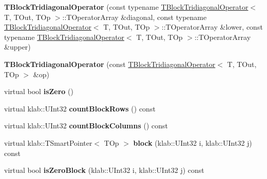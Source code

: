 \begin{DoxyCompactItemize}
\item 
{\bfseries T\+Block\+Tridiagonal\+Operator} (const typename \hyperlink{classkl1p_1_1TBlockTridiagonalOperator}{T\+Block\+Tridiagonal\+Operator}$<$ T, T\+Out, T\+Op $>$\+::T\+Operator\+Array \&diagonal, const typename \hyperlink{classkl1p_1_1TBlockTridiagonalOperator}{T\+Block\+Tridiagonal\+Operator}$<$ T, T\+Out, T\+Op $>$\+::T\+Operator\+Array \&lower, const typename \hyperlink{classkl1p_1_1TBlockTridiagonalOperator}{T\+Block\+Tridiagonal\+Operator}$<$ T, T\+Out, T\+Op $>$\+::T\+Operator\+Array \&upper)\hypertarget{classkl1p_1_1TBlockTridiagonalOperator_a87a7873f0782fb05915f809fc36319da}{}\label{classkl1p_1_1TBlockTridiagonalOperator_a87a7873f0782fb05915f809fc36319da}

\item 
{\bfseries T\+Block\+Tridiagonal\+Operator} (const \hyperlink{classkl1p_1_1TBlockTridiagonalOperator}{T\+Block\+Tridiagonal\+Operator}$<$ T, T\+Out, T\+Op $>$ \&op)\hypertarget{classkl1p_1_1TBlockTridiagonalOperator_aa0adc9ee189b2a204de3c17342b46729}{}\label{classkl1p_1_1TBlockTridiagonalOperator_aa0adc9ee189b2a204de3c17342b46729}

\item 
virtual bool {\bfseries is\+Zero} ()\hypertarget{classkl1p_1_1TBlockTridiagonalOperator_a6a373ba3575c7881967d7073001d810b}{}\label{classkl1p_1_1TBlockTridiagonalOperator_a6a373ba3575c7881967d7073001d810b}

\item 
virtual klab\+::\+U\+Int32 {\bfseries count\+Block\+Rows} () const \hypertarget{classkl1p_1_1TBlockTridiagonalOperator_aac39849319dece38b0634cab0ce861e0}{}\label{classkl1p_1_1TBlockTridiagonalOperator_aac39849319dece38b0634cab0ce861e0}

\item 
virtual klab\+::\+U\+Int32 {\bfseries count\+Block\+Columns} () const \hypertarget{classkl1p_1_1TBlockTridiagonalOperator_aceac6d7a78d22b49164806d78bee6f9f}{}\label{classkl1p_1_1TBlockTridiagonalOperator_aceac6d7a78d22b49164806d78bee6f9f}

\item 
virtual klab\+::\+T\+Smart\+Pointer$<$ T\+Op $>$ {\bfseries block} (klab\+::\+U\+Int32 i, klab\+::\+U\+Int32 j) const \hypertarget{classkl1p_1_1TBlockTridiagonalOperator_a0bc4423406e914e2ad6aa5b81d59ba08}{}\label{classkl1p_1_1TBlockTridiagonalOperator_a0bc4423406e914e2ad6aa5b81d59ba08}

\item 
virtual bool {\bfseries is\+Zero\+Block} (klab\+::\+U\+Int32 i, klab\+::\+U\+Int32 j) const \hypertarget{classkl1p_1_1TBlockTridiagonalOperator_a834b9d95a38de854034c7b097e2f4d09}{}\label{classkl1p_1_1TBlockTridiagonalOperator_a834b9d95a38de854034c7b097e2f4d09}


\end{DoxyCompactItemize}
